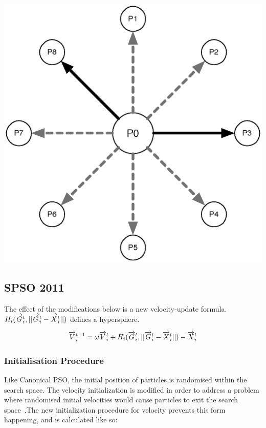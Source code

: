 \documentclass{csfourzero}
\newcommand{\rarrow}[1]{\overrightarrow{#1\vphantom{b}}}
\newenvironment{Figure}
  {\par\medskip\noindent\minipage{\linewidth}}
  {\endminipage\par\medskip}
\begin{document}
\begin{multicols}{3}
  \begin{Figure}
    \centering
    \includegraphics[width=\linewidth]{star_topology.eps}\label{fig:adaptive_random_topology}
  \end{Figure}
\end{multicols}

\subsection{SPSO 2011}

The effect of the modifications below is a new velocity-update formula.
$H_i(\rarrow{G}_i^t,||\rarrow{G}_i^t - \rarrow{X}_i^t||)$ defines a
hypersphere.

\begin{equation}
  \rarrow{V}_i^{t+1} = \omega \rarrow{V}_i^t + H_i(\rarrow{G}_i^t,||\rarrow{G}_i^t - \rarrow{X}_i^t||) - \rarrow{X}_i^t
\end{equation}

\subsubsection{Initialisation Procedure}

Like Canonical PSO, the initial position of particles is randomised within the
search space. The velocity initialization is modified in order to address a
problem where randomised initial velocities would cause particles to exit the
search space~\cite{Helwig:2008bl}.The new initialization procedure for velocity
prevents this form happening, and is calculated like so:
\end{document}
